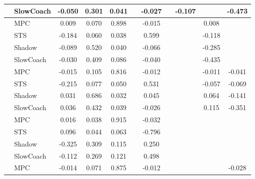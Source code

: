 \begin{tabular}{|l|l|*{9}{c|}}
                                                           & SlowCoach &   -0.050 &     0.301 &     0.041 &     & -0.027 &     &  -0.107 &      &   -0.473 \\
\midrule
[True, True, True, False, True, False, False, True, False] & MPC &    0.009 &     0.070 &     0.898 &     & -0.015 &     &      &   0.008 &       \\
                                                           & STS &   -0.184 &     0.060 &     0.038 &     &  0.599 &     &      &  -0.118 &       \\
                                                           & Shadow &   -0.089 &     0.520 &     0.040 &     & -0.066 &     &      &  -0.285 &       \\
                                                           & SlowCoach &   -0.030 &     0.409 &     0.086 &     & -0.040 &     &      &  -0.435 &       \\
\midrule
[True, True, True, False, True, False, False, True, True] & MPC &   -0.015 &     0.105 &     0.816 &     & -0.012 &     &      &  -0.011 &   -0.041 \\
                                                           & STS &   -0.215 &     0.077 &     0.050 &     &  0.531 &     &      &  -0.057 &   -0.069 \\
                                                           & Shadow &    0.031 &     0.686 &     0.032 &     &  0.045 &     &      &   0.064 &   -0.141 \\
                                                           & SlowCoach &    0.036 &     0.432 &     0.039 &     & -0.026 &     &      &   0.115 &   -0.351 \\
\midrule
[True, True, True, False, True, False, False, False, False] & MPC &    0.016 &     0.038 &     0.915 &     & -0.032 &     &      &      &       \\
                                                           & STS &    0.096 &     0.044 &     0.063 &     & -0.796 &     &      &      &       \\
                                                           & Shadow &   -0.325 &     0.309 &     0.115 &     &  0.250 &     &      &      &       \\
                                                           & SlowCoach &   -0.112 &     0.269 &     0.121 &     &  0.498 &     &      &      &       \\
\midrule
[True, True, True, False, True, False, False, False, True] & MPC &   -0.014 &     0.071 &     0.875 &     & -0.012 &     &      &      &   -0.028 \\

\end{tabular}
